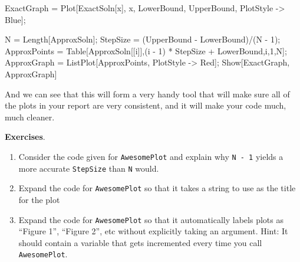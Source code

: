 \begin{code}
	   ExactGraph = Plot[ExactSoln[x], {x, LowerBound, UpperBound}, PlotStyle -> Blue];

	   N = Length[ApproxSoln];
	   StepSize = (UpperBound - LowerBound)/(N - 1);
	   ApproxPoints = Table[{ApproxSoln[[i]],(i - 1) * StepSize + LowerBound},{i,1,N}];
	   ApproxGraph = ListPlot[ApproxPoints, PlotStyle -> Red];
	   Show[ExactGraph, ApproxGraph]
\end{code}

And we can see that this will form a very handy tool that will make sure all of the plots in your report are very consistent, and it will make your code much, much cleaner.

\textbf{Exercises}.
\begin{enumerate}
	   \item Consider the code given for \texttt{AwesomePlot} and explain why \texttt{N - 1} yields a more accurate \texttt{StepSize} than \texttt{N} would.
	   \item Expand the code for \texttt{AwesomePlot} so that it takes a string to use as the title for the plot
	   \item Expand the code for \texttt{AwesomePlot} so that it automatically labels plots as ``Figure 1'', ``Figure 2'', etc without explicitly taking an argument. Hint: It should contain a variable that gets incremented every time you call \texttt{AwesomePlot}. 
\end{enumerate}
